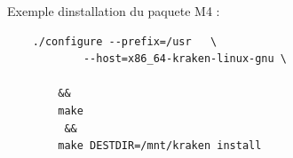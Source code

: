 
Exemple dinstallation du paquete M4 :

\begin{verbatim}
    ./configure --prefix=/usr   \
            --host=x86_64-kraken-linux-gnu \
            
        && 
        make
         &&
        make DESTDIR=/mnt/kraken install    
\end{verbatim}


